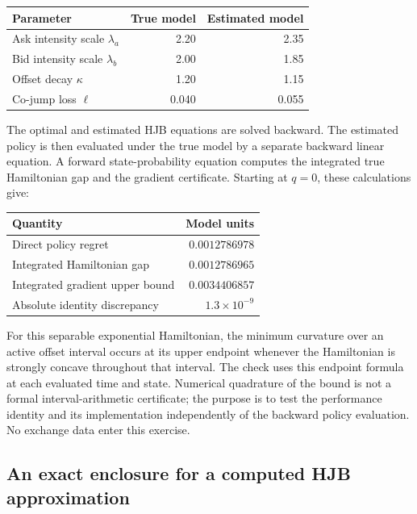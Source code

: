 \documentclass[11pt]{article}
\theoremstyle{plain}
\theoremstyle{definition}
\theoremstyle{remark}
\begin{document}
\begin{center}
\begin{tabular}{@{}lrr@{}}
\toprule
Parameter&True model&Estimated model\\
\midrule
Ask intensity scale \(\lambda_a\)&2.20&2.35\\
Bid intensity scale \(\lambda_b\)&2.00&1.85\\
Offset decay \(\kappa\)&1.20&1.15\\
Co-jump loss \(\ell\)&0.040&0.055\\
\bottomrule
\end{tabular}
\end{center}

The optimal and estimated HJB equations are solved backward. The
estimated policy is then evaluated under the true model by a separate
backward linear equation. A forward state-probability equation computes
the integrated true Hamiltonian gap and the gradient certificate.
Starting at \(q=0\), these calculations give:

\begin{center}
\begin{tabular}{@{}lr@{}}
\toprule
Quantity&Model units\\
\midrule
Direct policy regret&\(0.0012786978\)\\
Integrated Hamiltonian gap&\(0.0012786965\)\\
Integrated gradient upper bound&\(0.0034406857\)\\
Absolute identity discrepancy&\(1.3\times10^{-9}\)\\
\bottomrule
\end{tabular}
\end{center}

For this separable exponential Hamiltonian, the minimum curvature over
an active offset interval occurs at its upper endpoint whenever the
Hamiltonian is strongly concave throughout that interval. The check
uses this endpoint formula at each evaluated time and state. Numerical
quadrature of the bound is not a formal interval-arithmetic certificate;
the purpose is to test the performance identity and its implementation
independently of the backward policy evaluation. No exchange data enter
this exercise.

\subsection{An exact enclosure for a computed HJB approximation}
\end{document}
